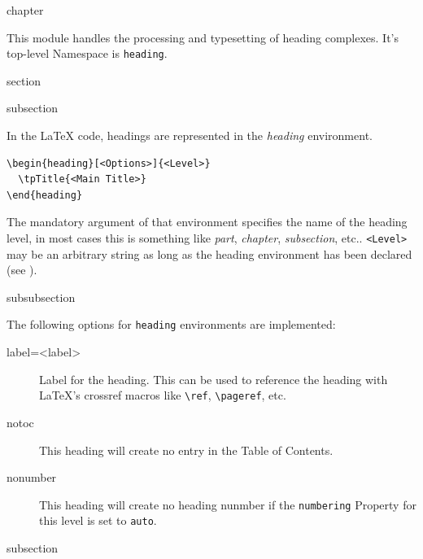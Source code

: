 \begin{heading}[label=chap:headings]{chapter}
\end{heading}

This module handles the processing and typesetting of heading
complexes. It's top-level Namespace is \texttt{heading}.

\begin{heading}[label=sec:hdg]{section}
\end{heading}

\begin{heading}[label=sec:hdg:headingenv]{subsection}
\end{heading}

In the {\LaTeX} code, headings are represented in the \textit{heading}
environment.
\begin{lstlisting}[style=tex]
\begin{heading}[<Options>]{<Level>}
  \tpTitle{<Main Title>}
\end{heading}
\end{lstlisting}
The mandatory argument of that environment specifies the name of the
heading level, in most cases this is something like \textit{part},
\textit{chapter}, \textit{subsection}, etc.. \lstinline{<Level>} may
be an arbitrary string as long as the heading environment has been
declared (see ).

\begin{heading}[label=sec:hdg:comp:options]{subsubsection}
\end{heading}

The following options for \lstinline{heading} environments are implemented:
\begin{description}
\item[label=<label>] Label for the heading. This can be used to
  reference the heading with \LaTeX's crossref macros like
  \lstinline{\ref}, \lstinline{\pageref}, etc.
\item[notoc] This heading will create no entry in the Table of Contents.
\item[nonumber] This heading will create no heading nunmber if the
  \lstinline{numbering} Property for this level is set to
  \lstinline{auto}.
\end{description}

\begin{heading}[label=sec:hdg:comp]{subsection}
\end{heading}

